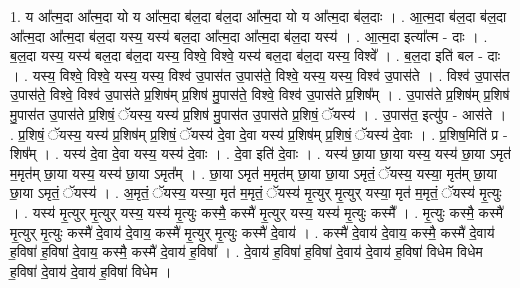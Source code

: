 \documentclass[17pt]{extarticle}
\begin{document}
1. य आ᳚त्म॒दा आ᳚त्म॒दा यो य आ᳚त्म॒दा ब॑ल॒दा ब॑ल॒दा आ᳚त्म॒दा यो य आ᳚त्म॒दा ब॑ल॒दाः । . आ॒त्म॒दा ब॑ल॒दा ब॑ल॒दा आ᳚त्म॒दा आ᳚त्म॒दा ब॑ल॒दा यस्य॒ यस्य॑ बल॒दा आ᳚त्म॒दा आ᳚त्म॒दा ब॑ल॒दा यस्य॑ । . आ॒त्म॒दा इत्या᳚त्म - दाः । . ब॒ल॒दा यस्य॒ यस्य॑ बल॒दा ब॑ल॒दा यस्य॒ विश्वे॒ विश्वे॒ यस्य॑ बल॒दा ब॑ल॒दा यस्य॒ विश्वे᳚ । . ब॒ल॒दा इति॑ बल - दाः । . यस्य॒ विश्वे॒ विश्वे॒ यस्य॒ यस्य॒ विश्व॑ उ॒पास॑त उ॒पास॑ते॒ विश्वे॒ यस्य॒ यस्य॒ विश्व॑ उ॒पास॑ते । . विश्व॑ उ॒पास॑त उ॒पास॑ते॒ विश्वे॒ विश्व॑ उ॒पास॑ते प्र॒शिष॑म् प्र॒शिष॑ मु॒पास॑ते॒ विश्वे॒ विश्व॑ उ॒पास॑ते प्र॒शिष᳚म् । . उ॒पास॑ते प्र॒शिष॑म् प्र॒शिष॑ मु॒पास॑त उ॒पास॑ते प्र॒शिषं॒ ॅयस्य॒ यस्य॑ प्र॒शिष॑ मु॒पास॑त उ॒पास॑ते प्र॒शिषं॒ ॅयस्य॑ । . उ॒पास॑त॒ इत्यु॑प - आस॑ते । . प्र॒शिषं॒ ॅयस्य॒ यस्य॑ प्र॒शिष॑म् प्र॒शिषं॒ ॅयस्य॑ दे॒वा दे॒वा यस्य॑ प्र॒शिष॑म् प्र॒शिषं॒ ॅयस्य॑ दे॒वाः । . प्र॒शिष॒मिति॑ प्र - शिष᳚म् । . यस्य॑ दे॒वा दे॒वा यस्य॒ यस्य॑ दे॒वाः । . दे॒वा इति॑ दे॒वाः । . यस्य॑ छा॒या छा॒या यस्य॒ यस्य॑ छा॒या ऽमृत॑ म॒मृत॑म् छा॒या यस्य॒ यस्य॑ छा॒या ऽमृत᳚म् । . छा॒या ऽमृत॑ म॒मृत॑म् छा॒या छा॒या ऽमृतं॒ ॅयस्य॒ यस्या॒ मृत॑म् छा॒या छा॒या ऽमृतं॒ ॅयस्य॑ । . अ॒मृतं॒ ॅयस्य॒ यस्या॒ मृत॑ म॒मृतं॒ ॅयस्य॑ मृ॒त्युर् मृ॒त्युर् यस्या॒ मृत॑ म॒मृतं॒ ॅयस्य॑ मृ॒त्युः । . यस्य॑ मृ॒त्युर् मृ॒त्युर् यस्य॒ यस्य॑ मृ॒त्युः कस्मै॒ कस्मै॑ मृ॒त्युर् यस्य॒ यस्य॑ मृ॒त्युः कस्मै᳚ । . मृ॒त्युः कस्मै॒ कस्मै॑ मृ॒त्युर् मृ॒त्युः कस्मै॑ दे॒वाय॑ दे॒वाय॒ कस्मै॑ मृ॒त्युर् मृ॒त्युः कस्मै॑ दे॒वाय॑ । . कस्मै॑ दे॒वाय॑ दे॒वाय॒ कस्मै॒ कस्मै॑ दे॒वाय॑ ह॒विषा॑ ह॒विषा॑ दे॒वाय॒ कस्मै॒ कस्मै॑ दे॒वाय॑ ह॒विषा᳚ । . दे॒वाय॑ ह॒विषा॑ ह॒विषा॑ दे॒वाय॑ दे॒वाय॑ ह॒विषा॑ विधेम विधेम ह॒विषा॑ दे॒वाय॑ दे॒वाय॑ ह॒विषा॑ विधेम । \newline
\end{document}
